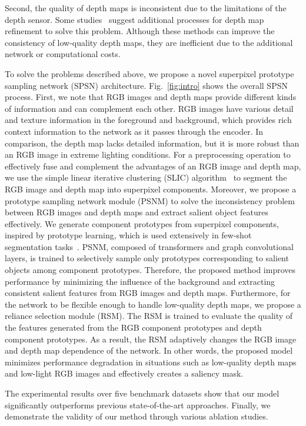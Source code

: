 \documentclass[runningheads]{llncs}
\begin{document}
	Second, the quality of depth maps is inconsistent due to the limitations of the depth sensor. Some studies~\cite{ji2021calibrated,sun2021deep} suggest additional processes for depth map refinement to solve this problem. Although these methods can improve the consistency of low-quality depth maps, they are inefficient due to the additional network or computational costs.
	
	To solve the problems described above, we propose a novel superpixel prototype sampling network (SPSN) architecture. Fig.~\ref{fig:intro} shows the overall SPSN process. First, we note that RGB images and depth maps provide different kinds of information and can complement each other. RGB images have various detail and texture information in the foreground and background, which provides rich context information to the network as it passes through the encoder. In comparison, the depth map lacks detailed information, but it is more robust than an RGB image in extreme lighting conditions. For a preprocessing operation to effectively fuse and complement the advantages of an RGB image and depth map, we use the simple linear iterative clustering (SLIC) algorithm~\cite{achanta2012slic} to segment the RGB image and depth map into superpixel components. Moreover, we propose a prototype sampling network module (PSNM) to solve the inconsistency problem between RGB images and depth maps and extract salient object features effectively. We generate component prototypes from superpixel components, inspired by prototype learning, which is used extensively in few-shot segmentation tasks~\cite{wang2019panet,li2021adaptive,liu2020part}. PSNM, composed of transformers and graph convolutional layers, is trained to selectively sample only prototypes corresponding to salient objects among component prototypes. Therefore, the proposed method improves performance by minimizing the influence of the background and extracting consistent salient features from RGB images and depth maps. Furthermore, for the network to be flexible enough to handle low-quality depth maps, we propose a reliance selection module (RSM). The RSM is trained to evaluate the quality of the features generated from the RGB component prototypes and depth component prototypes. As a result, the RSM adaptively changes the RGB image and depth map dependence of the network. In other words, the proposed model minimizes performance degradation in situations such as low-quality depth maps and low-light RGB images and effectively creates a saliency mask. 
	
	
	The experimental results over five benchmark datasets show that our model significantly outperforms previous state-of-the-art approaches. Finally, we demonstrate the validity of our method through various ablation studies.
	
\end{document}
